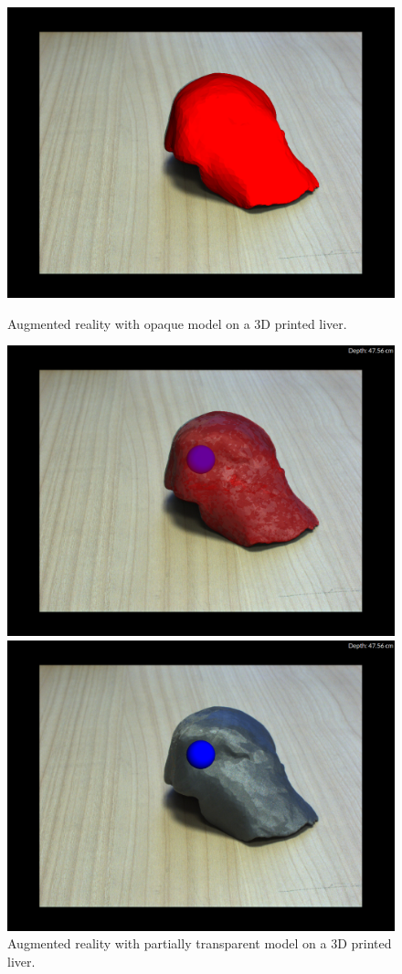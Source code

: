 \documentclass[12pt]{report}
\begin{document}
\begin{figure}[H]
\centerline{\includegraphics[scale = 0.2]{img/PLAimage_1.png}}
\caption{Augmented reality with opaque model on a 3D printed liver.}
\label{opaquemodelPLA}
\endminipage\hfill
{}
\centerline{\includegraphics[scale = 0.2]{img/PLAimage_2.png}}
\caption{Augmented reality with partially transparent model on a 3D printed liver.}
\label{transparentmodelPLA}
\endminipage\hfill
{}
\centerline{\includegraphics[scale = 0.2]{img/PLAimage_3.png}}

\end{figure}
\end{document}
